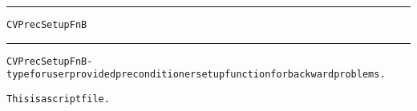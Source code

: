 \begin{samepage}
\hrule
\begin{center}
{\large \verb!CVPrecSetupFnB!}
\label{p:CVPrecSetupFnB}
\end{center}
\hrule\vspace{0.1in}



\begin{alltt}
CVPrecSetupFnB - type for user provided preconditioner setup function for backward problems.
\end{alltt}

\end{samepage}



\begin{samepage}


\begin{alltt}
This is a script file. 
\end{alltt}

\end{samepage}



